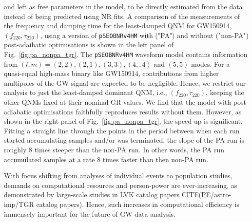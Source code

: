 \documentclass[twocolumn,prd,aps,superscriptaddress,preprintnumbers,tightenlines,showpacs,nofootinbib,eqsecnum,amsfonts,amsmath]{revtex4-1}
\begin{document}
and left as free parameters in the model, to be directly estimated from the data instead of being predicted using NR fits. A comparison of the measurements of the frequency and damping time for the least-damped QNM for GW150914, $(f_{220},\tau_{220})$, using a version of \texttt{pSEOBNRv4HM} with ("PA") and without ("non-PA") post-adaibatic optimisations is shown in the left panel of Fig.~\ref{fig:pa_nonpa_tgr}. The \texttt{pSEOBNRv4HM} waveform model contains information from $(l,m)=(2,2), (2,1),(3,3), (4,,4)$ and $(5,5)$ modes. For a quasi-equal high-mass binary like GW150914, contributions from higher multipoles of the GW signal are expected to be negligible. Hence, we restrict our analysis to just the least-damped dominant QNM, i.e., $(f_{220},\tau_{220})$, keeping the other QNMs fixed at their nominal GR values. We find that the model with post-adiabatic optimisations faithfully reproduces results without them. However, as shown in the right panel of Fig.~\ref{fig:pa_nonpa_tgr}, the speed-up is significant. Fitting a straight line through the points in the period between when each run started accumulating samples and/or was terminated, the slope of the PA run is roughly 8 times steeper than the non-PA run. In other words, the PA run accumulated samples at a rate 8 times faster than then non-PA run.
\par
With focus shifting from analyses of individual events to population studies, demands on computational resources and person-power are ever-increasing, as demonstrated by large-scale studies in LVK catalog papers CITE(PE/astro-imp/TGR catalog papers). Hence, such increases in computational efficiency is immensely important for the future of GW data analysis.
\end{document}
